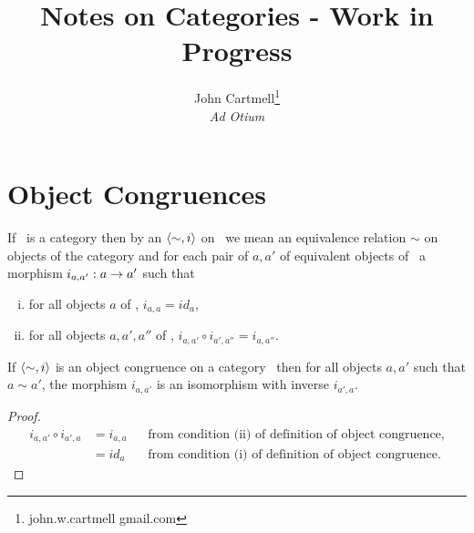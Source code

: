 \documentclass[10pt,a4paper]{scrartcl}
\title{Notes on Categories - Work in Progress}
\author{John Cartmell\footnote{john.w.cartmell gmail.com}\\ \normalsize{\textit{Ad Otium}}}
\begin{document}
\newcommand{\catc}{\cat{C}}
\newcommand{\catcw}{\ }

\section {Object Congruences}

\begin{definition}
If \catcw is a category  then by an  $\langle\sim,i\rangle$ on \catcw we mean  an equivalence relation $\sim$ on objects of the category and for each pair
of $a, a'$ of equivalent objects of \catcw a morphism $i_{a,a'}:a \rightarrow a'$ such that
\begin{enumerate} [(i)]
\item  for all objects $a$ of \catc, $i_{a,a}=id_a$,
\item for all objects $a, a', a''$ of \catc, $i_{a,a'}\circ i_{a',a''}=i_{a,a''}$.
\end{enumerate} 
\end{definition}

\begin{lemma}
If $\langle\sim,i\rangle$ is an object congruence on a category \catcw then
for all objects $a,a'$ such that $a \sim a'$, the morphism $i_{a,a'}$ is an isomorphism with inverse $i_{a',a}$.
\end{lemma}
\begin{proof}
\begin{align*}
i_{a,a'} \circ i_{a',a} &= i_{a,a} &&\mbox{from condition (ii) of definition of object congruence}, \\
                        &= id_a    &&\mbox{from condition (i) of definition of object congruence}.
\end{align*}
\end{proof}
\end{document}
